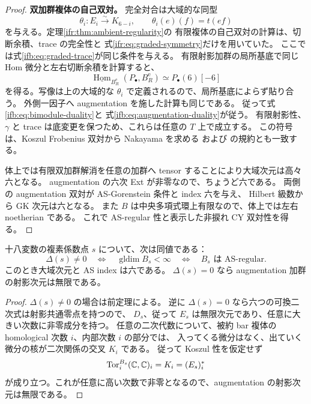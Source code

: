 \begin{proof}
\textbf{双加群複体の自己双対。}
完全対合は大域的な同型
\[
 \theta_i:E_i\xrightarrow{\sim}K_{6-i},\qquad
            \theta_i(e)(f)=t(ef)
\]
を与える。定理\ref{ifr:thm:ambient-regularity}の
有限複体の自己双対の計算は、切断余積、trace の完全性と
式\eqref{ifr:eq:graded-symmetry}だけを用いていた。
ここでは式\eqref{ifb:eq:graded-trace}が同じ条件を与える。
有限射影加群の局所基底で同じ Hom 微分と左右切断余積を計算すると、
\[
 \underline{\operatorname{Hom}}_{B_R^{\mathrm e}}(P_\bullet,B_R^{\mathrm e})
                    \simeq P_\bullet(6)[-6]
\]
を得る。写像は上の大域的な $\theta_i$ で定義されるので、局所基底によらず貼り合う。
外側一因子へ augmentation を施した計算も同じである。
従って式\eqref{ifb:eq:bimodule-duality}と
式\eqref{ifb:eq:augmentation-duality}が従う。
有限射影性、$\gamma$ と trace は底変更を保つため、これらは任意の $T$ 上で成立する。
この符号は、Koszul Frobenius 双対から Nakayama を求める
\cite[Theorem~6.3, Proposition~6.4]{IFRBergerMarconnet}および
\cite[Lemmas~1.1--1.2]{IFRHeVanOystaeyenZhang}の規約とも一致する。

体上では有限双加群解消を任意の加群へ tensor することにより大域次元は高々六となる。
augmentation の六次 Ext が非零なので、ちょうど六である。
両側の augmentation 双対が AS-Gorenstein 条件と index 六を与え、
Hilbert 級数から GK 次元は六となる。
また $B$ は中央多項式環上有限なので、体上では左右 noetherian である。
これで AS-regular 性と表示した非捩れ CY 双対性を得る。
\end{proof}

\begin{corollary}[有限大域次元の正確な係数領域]
\label{ifb:cor:exact-regular-locus}
十八変数の複素係数点 $s$ について、次は同値である：
\[
 \Delta(s)\ne0
 \quad\Longleftrightarrow\quad
 \operatorname{gldim}B_s<\infty
 \quad\Longleftrightarrow\quad
 B_s\text{ は AS-regular}.
\]
このとき大域次元と AS index は六である。
$\Delta(s)=0$ なら augmentation 加群の射影次元は無限である。
\end{corollary}

\begin{proof}
$\Delta(s)\ne0$ の場合は前定理による。
逆に $\Delta(s)=0$ なら六つの可換二次式は射影共通零点を持つので、
$D_s$、従って $E_s$ は無限次元であり、任意に大きい次数に非零成分を持つ。
任意の二次代数について、被約 bar 複体の homological 次数 $i$、内部次数 $i$ の部分では、
入ってくる微分はなく、出ていく微分の核が二次関係の交叉 $K_i$ である。
従って Koszul 性を仮定せず
\[
       \operatorname{Tor}^{B_s}_i(\mathbb C,\mathbb C)_i
                         =K_i=(E_s)_i^*
\]
が成り立つ。これが任意に高い次数で非零となるので、augmentation の射影次元は無限である。
\end{proof}

